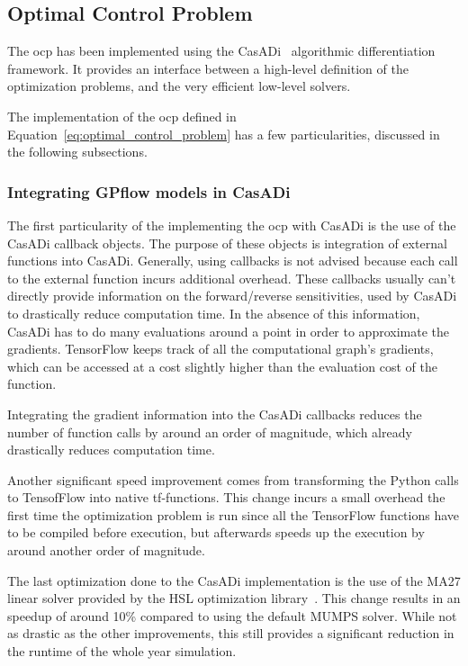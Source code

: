 \subsection{Optimal Control Problem}

The \acrlong{ocp} has been implemented using the
CasADi~\cite{anderssonCasADiSoftwareFramework2019} algorithmic differentiation
framework. It provides an interface between a high-level definition of the
optimization problems, and the very efficient low-level solvers. 

The implementation of the \acrshort{ocp} defined in
Equation~\ref{eq:optimal_control_problem} has a few particularities, discussed
in the following subsections.

\subsubsection{Integrating GPflow models in CasADi}

The first particularity of the implementing the \acrshort{ocp} with CasADi is
the use of the CasADi callback objects. The purpose of these objects is
integration of external functions into CasADi. Generally, using callbacks is not
advised because each call to the external function incurs additional overhead.
These callbacks usually can't directly provide information on the
forward/reverse sensitivities, used by CasADi to drastically reduce computation
time. In the absence of this information, CasADi has to do many evaluations
around a point in order to approximate the gradients. TensorFlow keeps track of
all the computational graph's gradients, which can be accessed at a cost
slightly higher than the evaluation cost of the function.

Integrating the gradient information into the CasADi callbacks reduces the
number of function calls by around an order of magnitude, which already
drastically reduces computation time.

Another significant speed improvement comes from transforming the Python calls
to TensofFlow into native tf-functions. This change incurs a small overhead the
first time the optimization problem is run since all the TensorFlow functions
have to be compiled before execution, but afterwards speeds up the execution by
around another order of magnitude.

The last optimization done to the CasADi implementation is the use of the MA27
linear solver provided by the HSL optimization
library~\cite{HSLCollectionFortran}. This change results in an speedup of around
10\% compared to using the default MUMPS solver. While not as drastic as the
other improvements, this still provides a significant reduction in the runtime
of the whole year simulation.

